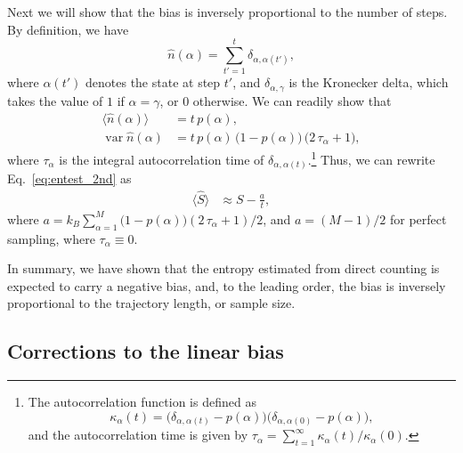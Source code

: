 \documentclass[reprint, superscriptaddress]{revtex4-1}
\begin{document}
Next we will show that the bias is inversely proportional
to the number of steps.
%
By definition, we have
%
\begin{equation*}
  \hat{n}(\alpha) = \sum_{t' = 1}^t \delta_{\alpha, \alpha(t')},
\end{equation*}
%
where $\alpha(t')$ denotes the state at step $t'$,
and $\delta_{\alpha, \gamma}$ is the Kronecker delta,
which takes the value of $1$ if $\alpha = \gamma$, or $0$ otherwise.
%
We can readily show that
\begin{align*}
  \bigl\langle \hat{n}(\alpha) \bigr\rangle
  &=
  t \, p(\alpha), \\
  \operatorname{var}{\hat{n}(\alpha)}
  &=
  t \, p(\alpha) \, \bigl( 1 - p(\alpha) \bigr) \, \bigl(2 \, \tau_\alpha + 1\bigr)
  ,
\end{align*}
%
where $\tau_\alpha$ is the integral autocorrelation time of $\delta_{\alpha, \alpha(t)}$.\footnote{
The autocorrelation function is defined as
$$
\kappa_\alpha(t) = \bigl(\delta_{\alpha, \alpha(t)} - p(\alpha)\bigr)
\bigl(\delta_{\alpha, \alpha(0)} - p(\alpha)\bigr),
$$
and the autocorrelation time is given by
$\tau_\alpha = \sum_{t = 1}^\infty \kappa_\alpha(t)/\kappa_\alpha(0)$.
}
%
Thus, we can rewrite Eq.~\eqref{eq:entest_2nd} as
%
\begin{align}
  \bigl\langle \hat S \bigr\rangle
  &\approx
  S - \frac{ a } { t }
  ,
  \label{eq:Shat_ave}
\end{align}
%
where $a = k_B \sum_{\alpha = 1}^M
    \bigl(1 - p(\alpha)\bigr) ( 2 \, \tau_\alpha + 1)/2$,
%
and $a = (M-1)/2$ for perfect sampling, where $\tau_\alpha \equiv 0$.

In summary, we have shown that the entropy estimated
from direct counting
is expected to carry a negative bias,
and, to the leading order, the bias is
inversely proportional to the trajectory length,
or sample size.



\subsection{Corrections to the linear bias}
\end{document}
